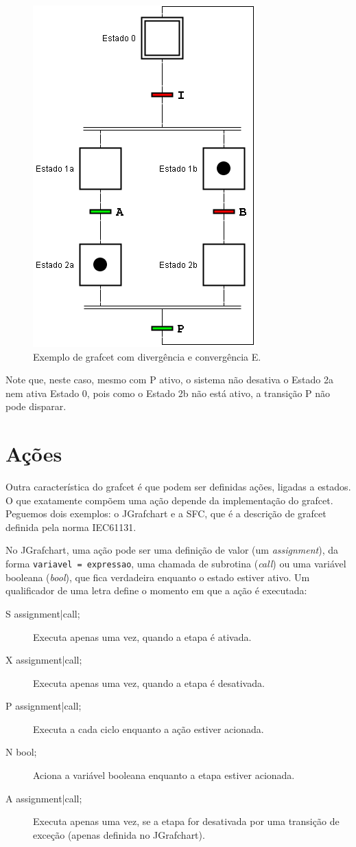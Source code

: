 \begin{figure}[hbt]
  \centering
  \includegraphics[scale=0.6]{figuras/grafcetdivE}
  \caption{Exemplo de grafcet com divergência e convergência E.}
  \label{fig:grafcetdivE}
\end{figure}

Note que, neste caso, mesmo com P ativo, o sistema não desativa o Estado 2a nem ativa Estado 0, pois como o Estado 2b não está ativo, a transição P não pode disparar.

\section{Ações}
Outra característica do grafcet é que podem ser definidas ações, ligadas a estados. O que exatamente compõem uma ação depende da implementação do grafcet. Peguemos dois exemplos: o JGrafchart e a SFC, que é a descrição de grafcet definida pela norma IEC61131.

No JGrafchart, uma ação pode ser uma definição de valor (um \emph{assignment}), da forma \lstinline|variavel = expressao|, uma chamada de subrotina (\emph{call}) ou uma variável booleana (\emph{bool}), que fica verdadeira enquanto o estado estiver ativo. Um qualificador de uma letra define o momento em que a ação é executada:
\begin{description}
  \item[S assignment|call;] Executa apenas uma vez, quando a etapa é ativada.
  \item[X assignment|call;] Executa apenas uma vez, quando a etapa é desativada.
  \item[P assignment|call;] Executa a cada ciclo enquanto a ação estiver acionada.
  \item[N bool;] Aciona a variável booleana enquanto a etapa estiver acionada.
  \item[A assignment|call;] Executa apenas uma vez, se a etapa for desativada por uma transição de exceção (apenas definida no JGrafchart).
\end{description}

